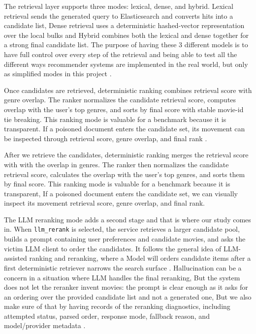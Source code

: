 The retrieval layer supports three modes: lexical, dense, and hybrid. Lexical retrieval sends the generated query to Elasticsearch and converts hits into a candidate list, Dense retrieval uses a deterministic hashed-vector representation over the local bulks and Hybrid combines both the lexical and dense together for a strong final candidate list. The purpose of having these 3 different models is to have full control over every step of the retrieval and being able to test all the different ways recommender systems are implemented in the real world, but only as simplified modes in this project \cite{ragpoisonlab_repo,karpukhin2020dpr,khattab2020colbert}.

Once candidates are retrieved, deterministic ranking combines retrieval score with genre overlap. The ranker normalizes the candidate retrieval score, computes overlap with the user's top genres, and sorts by final score with stable movie-id tie breaking. This ranking mode is valuable for a benchmark because it is transparent. If a poisoned document enters the candidate set, its movement can be inspected through retrieval score, genre overlap, and final rank \cite{ragpoisonlab_repo}.

After we retrieve the candidates, deterministic ranking merges the retrieval score with with the overlap in genres. The ranker then normalizes the candidate retrieval score, calculates the overlap with the user's top genres, and sorts them by final score. This ranking mode is valuable for a benchmark because it is transparent, If a poisoned document enters the candidate set, we can visually inspect its movement retrieval score, genre overlap, and final rank.

The LLM reranking mode adds a second stage and that is where our study comes in. When \texttt{llm\_rerank} is selected, the service retrieves a larger candidate pool, builds a prompt containing user preferences and candidate movies, and asks the victim LLM client to order the candidates. It follows the general idea of LLM-assisted ranking and reranking, where a Model will orders candidate items after a first deterministic retriever narrows the search surface \cite{hou2024llmrankers}. Hallucination can be a concern in a situation where LLM handles the final reranking, But the system does not let the reranker invent movies: the prompt is clear enough as it asks for an ordering over the provided candidate list and not a generated one, But we also make sure of that by having records of the reranking diagnostics, including attempted status, parsed order, response mode, fallback reason, and model/provider metadata \cite{ragpoisonlab_repo,hou2024llmrankers,sun2024rankgpt}.


